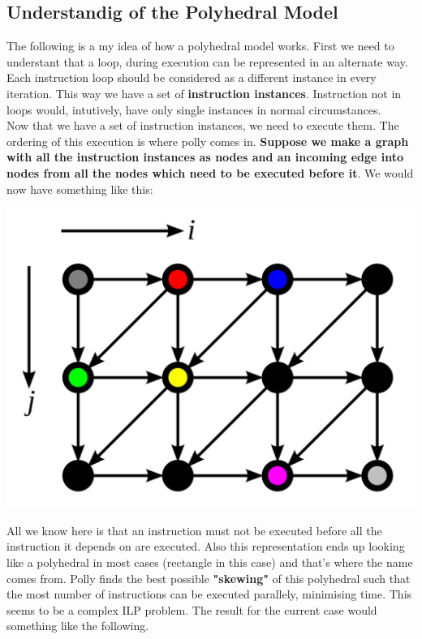 \documentclass[a4paper,12pt]{report}
\begin{document}
\subsection{Understandig of the Polyhedral Model}
The following is a my idea of how a polyhedral model works. First we need to understant that a loop, during execution can be represented in an alternate way. Each instruction loop should be considered as a different instance in every iteration. This way we have a set of \textbf{instruction instances}. Instruction not in loops would, intutively, have only single instances in normal circumstances.\\
Now that we have a set of instruction instances, we need to execute them. The ordering of this execution is where polly comes in. \textbf{Suppose we make a graph with all the instruction instances as nodes and an incoming edge into nodes from all the nodes which need to be executed before it}. We would now have something like this:
\begin{center}
\includegraphics[scale=0.13]{polyi.png}
\end{center}
All we know here is that an instruction must not be executed before all the instruction it depends on are executed. Also this representation ends up looking like a polyhedral in most cases (rectangle in this case) and that's where the name comes from. Polly finds the best possible \textbf{"skewing"} of this polyhedral such that the most number of instructions can be  executed parallely, minimising time. This seems to be a complex ILP problem. The result for the current case would something like the following.
\end{document}
